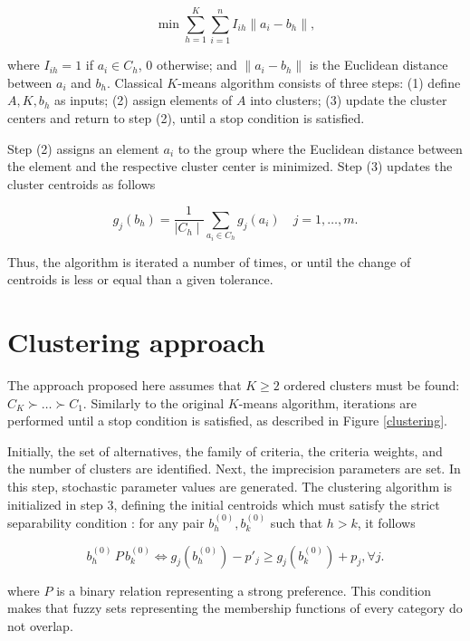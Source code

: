 \documentclass[]{elsarticle}
\theoremstyle{definition}
\begin{document}
\begin{equation}
\min \sum_{h=1}^{K} \sum_{i=1}^{n} I_{ih} \left\| a_i-b_h \right\|,
\end{equation}


\noindent
where  $I_{ih}=1$ if $a_i \in C_h$, $0$ otherwise; and $ \left\| a_i-b_h \right\|$ is the Euclidean distance between $a_i$ and $b_h$.  Classical $K$-means algorithm consists of three steps: (1) define $A, K, b_h$ as inputs; (2) assign elements of $A$ into clusters; (3) update the cluster centers and return to step (2), until a stop condition is satisfied.   

Step (2) assigns an element $a_i$ to the group where the Euclidean distance between the element and the respective cluster center is minimized.  Step (3) updates the cluster centroids as follows


\begin{equation}
g_j(b_h) = \frac{1}{\mid C_h \mid} \sum_{a_i \in C_h} g_j(a_i) \quad j=1,\ldots,m. \label{newcentroid}
\end{equation}

\noindent
Thus, the algorithm is iterated a number of times, or until the  change of centroids is less or equal than a given tolerance.


\section{Clustering approach}\label{methodology}

The approach proposed here assumes that $K\geq 2$ ordered clusters must be found: $C_K \succ \ldots \succ C_1$. Similarly to the original $K$-means algorithm, iterations are performed until a stop condition is satisfied, as described  in Figure \ref{clustering}.  

Initially, the set of alternatives, the family of criteria, the criteria weights, and the number of clusters are identified.  Next, the imprecision parameters are set. In this step, stochastic parameter values are generated.  The clustering algorithm is initialized in step 3, defining the initial centroids which must satisfy the strict separability condition \citep{roy2012}:  for any pair $b_h^{(0)}, b_k^{(0)}$ such that $h>k$, it follows 

\begin{equation}
b_h^{(0)} \,P\, b_k^{(0)} \Leftrightarrow g_j(b_h^{(0)})-p'_j \geq g_j(b_k^{(0)})+p_j, \forall j.
\end{equation}

\noindent
where $P$ is a binary relation representing a strong preference.  This condition makes that fuzzy sets representing the membership functions of every category do not overlap. 
\end{document}

